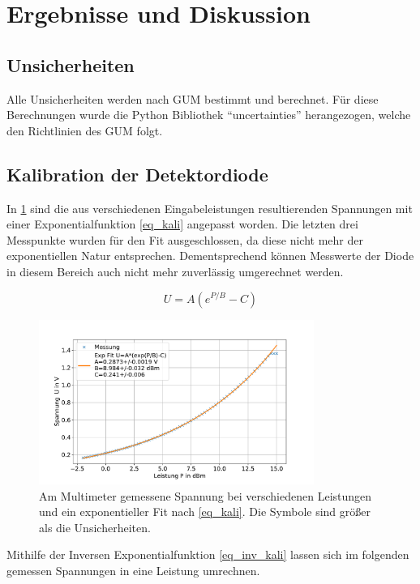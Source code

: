 \documentclass[
	a4paper,
	12pt,
	pagesize,
	ngerman
]{scrartcl}
\begin{document}
	\section{Ergebnisse und Diskussion}


	\subsection{Unsicherheiten}
	Alle Unsicherheiten werden nach GUM bestimmt und berechnet.
	Für diese Berechnungen wurde die Python Bibliothek \enquote{uncertainties} herangezogen, welche den Richtlinien des GUM folgt.

	\subsection{Kalibration der Detektordiode}
	In \cref{fig_diode_kali} sind die aus verschiedenen Eingabeleistungen resultierenden Spannungen mit einer Exponentialfunktion \cref{eq_kali} angepasst worden.
	Die letzten drei Messpunkte wurden für den Fit ausgeschlossen, da diese nicht mehr der exponentiellen Natur entsprechen.
	Dementsprechend können Messwerte der Diode in diesem Bereich auch nicht mehr zuverlässig umgerechnet werden.

	\begin{equation}
		\label{eq_kali}
		U = A(e^{P/B}-C)
	\end{equation}

	\begin{figure}[H]
		\includegraphics[width=0.8\textwidth]{img/diode-kali}
		\centering
		\caption{
			Am Multimeter gemessene Spannung bei verschiedenen Leistungen und ein exponentieller Fit nach \cref{eq_kali}.
			Die Symbole sind größer als die Unsicherheiten.
		}
		\label{fig_diode_kali}
		\centering
	\end{figure}
	Mithilfe der Inversen Exponentialfunktion \cref{eq_inv_kali} lassen sich im folgenden gemessen Spannungen in eine Leistung umrechnen.
\end{document}
